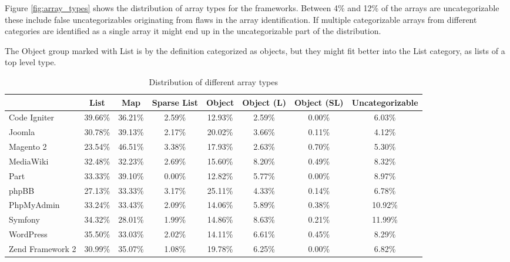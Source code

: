 Figure \ref{fig:array_types} shows the distribution of array types for the frameworks.  Between 4\% and 12\% of the arrays are uncategorizable these include false uncategorizables originating from flaws in the array identification. If multiple categorizable arrays from different categories are identified as a single array it might end up in the uncategorizable part of the distribution.

The Object group marked with List is by the definition categorized as objects, but they might fit better into the List category, as lists of a top level type. 

\begin{table}[htbp]
\begin{adjustbox}{center}
\begin{tabular}{l | c c c c c c c}
    &   List    &   Map &   Sparse List &   Object  &   Object (L)   &   Object (SL)   &   Uncategorizable \\
\hline \hline
Code Igniter    &   39.66\% &   36.21\% &   2.59\%  &   12.93\% &   2.59\%  &   0.00\%  &   6.03\% \\
Joomla          &   30.78\% &   39.13\% &	2.17\%	&   20.02\% &	3.66\%	&   0.11\%  &   4.12\% \\
Magento 2	    &   23.54\% &   46.51\% &	3.38\%	&   17.93\% &	2.63\%	&   0.70\%  &   	5.30\% \\
MediaWiki	    &   32.48\%	&   32.23\% &	2.69\%	&   15.60\% &	8.20\%	&   0.49\%  &   	8.32\% \\
Part	        &   33.33\%	&   39.10\% &	0.00\%	&   12.82\% &	5.77\%	&   0.00\%  &   	8.97\% \\
phpBB	        &   27.13\%	&   33.33\% &	3.17\%	&   25.11\% &	4.33\%	&   0.14\%  &   	6.78\% \\
PhpMyAdmin	    &   33.24\%	&   33.43\% &	2.09\%	&   14.06\% &	5.89\%	&   0.38\%  &   	10.92\% \\
Symfony	        &   34.32\%	&   28.01\% &	1.99\%	&   14.86\% &	8.63\%	&   0.21\%  &   	11.99\% \\
WordPress	    &   35.50\%	&   33.03\% &	2.02\%	&   14.11\% &	6.61\%	&   0.45\%  &   	8.29\% \\
Zend Framework 2&	30.99\%	&   35.07\% &	1.08\%	&   19.78\% &	6.25\%	&   0.00\%  &   	6.82\% 
\end{tabular}
\end{adjustbox}
\caption{Distribution of different array types}
\label{tab:array_types}
\end{table}

